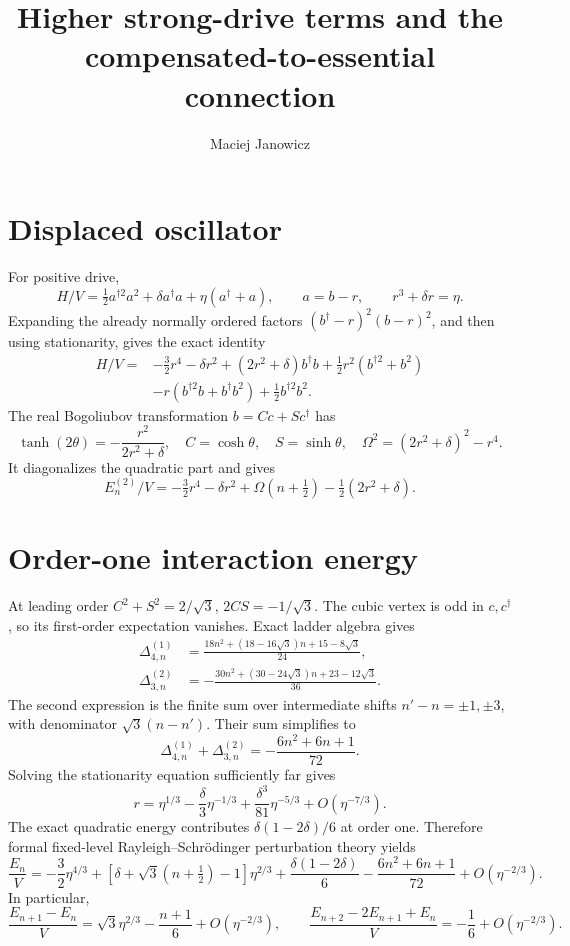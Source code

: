 \documentclass[11pt]{article}
\title{Higher strong-drive terms and the compensated-to-essential connection}
\author{Maciej Janowicz}
\date{}
\begin{document}
\maketitle

\section{Displaced oscillator}

For positive drive,
\[
 H/V=\tfrac12a^{\dagger2}a^2+\delta a^\dagger a
 +\eta(a^\dagger+a),\qquad a=b-r,\qquad r^3+\delta r=\eta .
\]
Expanding the already normally ordered factors
\((b^\dagger-r)^2(b-r)^2\), and then using stationarity, gives the exact
identity
\begin{align}
H/V={}&-\tfrac32r^4-\delta r^2+(2r^2+\delta)b^\dagger b
+\tfrac12r^2(b^{\dagger2}+b^2)\nonumber\\
&-r(b^{\dagger2}b+b^\dagger b^2)+\tfrac12b^{\dagger2}b^2.
\label{eq:shifted}
\end{align}
The real Bogoliubov transformation \(b=Cc+Sc^\dagger\) has
\[
\tanh(2\theta)=-\frac{r^2}{2r^2+\delta},\quad
C=\cosh\theta,\quad S=\sinh\theta,\quad
\Omega^2=(2r^2+\delta)^2-r^4.
\]
It diagonalizes the quadratic part and gives
\[
E_n^{(2)}/V=-\tfrac32r^4-\delta r^2
+\Omega(n+\tfrac12)-\tfrac12(2r^2+\delta).
\]

\section{Order-one interaction energy}

At leading order \(C^2+S^2=2/\sqrt3\), \(2CS=-1/\sqrt3\).
The cubic vertex is odd in \(c,c^\dagger\), so its first-order expectation
vanishes.  Exact ladder algebra gives
\begin{align}
\Delta_{4,n}^{(1)}
&=\frac{18n^2+(18-16\sqrt3)n+15-8\sqrt3}{24},\\
\Delta_{3,n}^{(2)}
&=-\frac{30n^2+(30-24\sqrt3)n+23-12\sqrt3}{36}.
\end{align}
The second expression is the finite sum over intermediate shifts
\(n'-n=\pm1,\pm3\), with denominator
\(\sqrt3(n-n')\).  Their sum simplifies to
\[
\Delta_{4,n}^{(1)}+\Delta_{3,n}^{(2)}
=-\frac{6n^2+6n+1}{72}.
\]
Solving the stationarity equation sufficiently far gives
\[
r=\eta^{1/3}-\frac{\delta}{3}\eta^{-1/3}
+\frac{\delta^3}{81}\eta^{-5/3}+O(\eta^{-7/3}).
\]
The exact quadratic energy contributes \(\delta(1-2\delta)/6\) at order
one.  Therefore formal fixed-level Rayleigh--Schr\"odinger perturbation
theory yields
\begin{equation}
\boxed{\frac{E_n}{V}=-\frac32\eta^{4/3}
+\left[\delta+\sqrt3(n+\tfrac12)-1\right]\eta^{2/3}
+\frac{\delta(1-2\delta)}6-\frac{6n^2+6n+1}{72}
+O(\eta^{-2/3}).}
\label{eq:energy}
\end{equation}
In particular,
\[
\frac{E_{n+1}-E_n}{V}=\sqrt3\eta^{2/3}-\frac{n+1}{6}
+O(\eta^{-2/3}),\qquad
\frac{E_{n+2}-2E_{n+1}+E_n}{V}=-\frac16+O(\eta^{-2/3}).
\]
\end{document}
